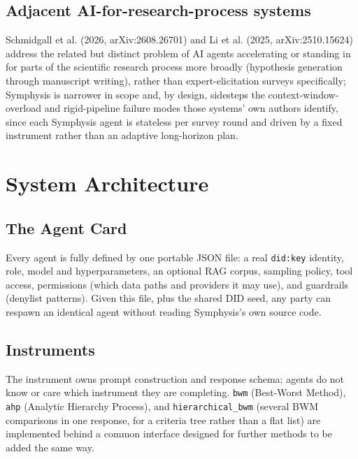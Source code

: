 \documentclass[11pt]{article}
\begin{document}
\subsection{Adjacent AI-for-research-process systems}
Schmidgall et al. (2026, arXiv:2608.26701) and Li et al. (2025,
arXiv:2510.15624) address the related but distinct problem of AI agents
accelerating or standing in for parts of the scientific research process
more broadly (hypothesis generation through manuscript writing), rather
than expert-elicitation surveys specifically; Symphysis is narrower in
scope and, by design, sidesteps the context-window-overload and
rigid-pipeline failure modes those systems' own authors identify, since
each Symphysis agent is stateless per survey round and driven by a fixed
instrument rather than an adaptive long-horizon plan.

\section{System Architecture}
\label{sec:architecture}

\subsection{The Agent Card}
Every agent is fully defined by one portable JSON file: a real
\texttt{did:key} identity, role, model and hyperparameters, an optional
RAG corpus, sampling policy, tool access, permissions (which data paths
and providers it may use), and guardrails (denylist patterns). Given this
file, plus the shared DID seed, any party can respawn an identical agent
without reading Symphysis's own source code.

\subsection{Instruments}
The instrument owns prompt construction and response schema; agents do
not know or care which instrument they are completing. \texttt{bwm}
(Best-Worst Method), \texttt{ahp} (Analytic Hierarchy Process), and
\texttt{hierarchical\_bwm} (several BWM comparisons in one response, for
a criteria tree rather than a flat list) are implemented behind a common
interface designed for further methods to be added the same way.
\end{document}
